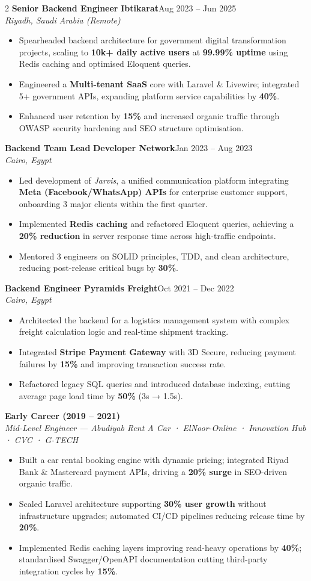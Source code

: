 \documentclass[10pt, a4paper]{article}
\newcommand{\job}[4]{%
  \vspace{5pt}%
  {\bfseries\color{Dark}#1}\enspace{\color{Light}|}\enspace%
  {\bfseries\color{Blue}#2}\hfill{\footnotesize\color{Light}#3}\\%
  {\small\itshape\color{Light}#4}\vspace{2pt}%
}
\newcommand{\bitem}[1]{%
  \item\small{\color{Mid}#1}%
}
\newenvironment{blist}{%
  \begin{itemize}[leftmargin=0.18in, itemsep=1pt, topsep=1pt, parsep=0pt]%
}{%
  \end{itemize}%
}
\begin{document}
\begin{paracol}{2}
\job{Senior Backend Engineer}{Ibtikarat}{Aug 2023 – Jun 2025}{Riyadh, Saudi Arabia (Remote)}
\begin{blist}
  \bitem{Spearheaded backend architecture for government digital transformation projects, scaling to \textbf{10k+ daily active users} at \textbf{99.99\% uptime} using Redis caching and optimised Eloquent queries.}
  \bitem{Engineered a \textbf{Multi-tenant SaaS} core with Laravel \& Livewire; integrated 5+ government APIs, expanding platform service capabilities by \textbf{40\%}.}
  \bitem{Enhanced user retention by \textbf{15\%} and increased organic traffic through OWASP security hardening and SEO structure optimisation.}
\end{blist}

\job{Backend Team Lead}{Developer Network}{Jan 2023 – Aug 2023}{Cairo, Egypt}
\begin{blist}
  \bitem{Led development of \textit{Jarvis}, a unified communication platform integrating \textbf{Meta (Facebook/WhatsApp) APIs} for enterprise customer support, onboarding 3 major clients within the first quarter.}
  \bitem{Implemented \textbf{Redis caching} and refactored Eloquent queries, achieving a \textbf{20\% reduction} in server response time across high-traffic endpoints.}
  \bitem{Mentored 3 engineers on SOLID principles, TDD, and clean architecture, reducing post-release critical bugs by \textbf{30\%}.}
\end{blist}

\job{Backend Engineer}{Pyramids Freight}{Oct 2021 – Dec 2022}{Cairo, Egypt}
\begin{blist}
  \bitem{Architected the backend for a logistics management system with complex freight calculation logic and real-time shipment tracking.}
  \bitem{Integrated \textbf{Stripe Payment Gateway} with 3D Secure, reducing payment failures by \textbf{15\%} and improving transaction success rate.}
  \bitem{Refactored legacy SQL queries and introduced database indexing, cutting average page load time by \textbf{50\%} (3s → 1.5s).}
\end{blist}

\vspace{6pt}
{\small\bfseries\color{Dark}Early Career (2019 – 2021)}\\
{\small\itshape\color{Light}Mid-Level Engineer — Abudiyab Rent A Car · ElNoor-Online · Innovation Hub · CVC · G-TECH}
\vspace{3pt}
\begin{blist}
  \bitem{Built a car rental booking engine with dynamic pricing; integrated Riyad Bank \& Mastercard payment APIs, driving a \textbf{20\% surge} in SEO-driven organic traffic.}
  \bitem{Scaled Laravel architecture supporting \textbf{30\% user growth} without infrastructure upgrades; automated CI/CD pipelines reducing release time by \textbf{20\%}.}
  \bitem{Implemented Redis caching layers improving read-heavy operations by \textbf{40\%}; standardised Swagger/OpenAPI documentation cutting third-party integration cycles by \textbf{15\%}.}
\end{blist}


\end{paracol}
\end{document}
